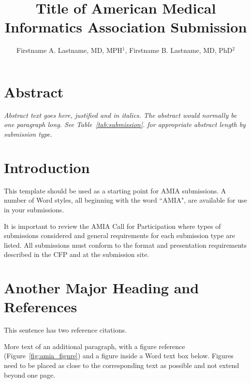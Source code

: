 \documentclass{amia}
\begin{document}
\title{Title of American Medical Informatics Association Submission}

\author{Firstname A. Lastname, MD, MPH$^1$, Firstname B. Lastname, MD, PhD$^2$ }


\maketitle

\section*{Abstract}

\textit{Abstract text goes here, justified and in italics.  The abstract would normally be one paragraph long.  See Table~\ref{tab:submission}. for appropriate abstract length by submission type.}

\section*{Introduction}

This template should be used as a starting point for AMIA submissions.  A number of Word styles, all beginning with the word ``AMIA", are available for use in your submissions.

It is important to review the AMIA Call for Participation where types of submissions considered and general requirements for each submission type are listed. All submissions must conform to the format and presentation requirements described in the CFP and at the submission site.


\section*{Another Major Heading and References}

This sentence has two reference citations\cite{pryor83,gardner90}.

More text of an additional paragraph, with a figure reference (Figure~\ref{fig:amia_figure}) and a figure inside a Word text box below.  Figures need to be placed as close to the corresponding text as possible and not extend beyond one page.
\end{document}
